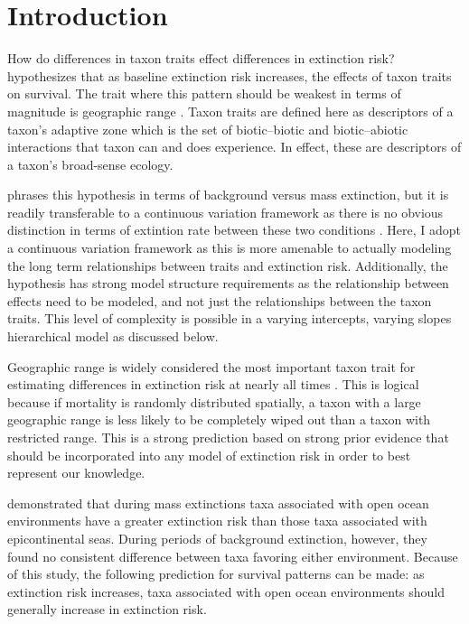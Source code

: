 \documentclass[12pt,letterpaper]{article}
\begin{document}
\section{Introduction}

How do differences in taxon traits effect differences in extinction risk? \citet{Jablonski1987} hypothesizes that as baseline extinction risk increases, the effects of taxon traits on survival. The trait where this pattern should be weakest in terms of magnitude is geographic range \citep{Jablonski1987}. Taxon traits are defined here as descriptors of a taxon's adaptive zone which is the set of biotic--biotic and biotic--abiotic interactions that taxon can and does experience. In effect, these are descriptors of a taxon's broad-sense ecology.

\citet{Jablonski1987} phrases this hypothesis in terms of background versus mass extinction, but it is readily transferable to a continuous variation framework as there is no obvious distinction in terms of extintion rate between these two conditions \citep{Wang2003}. Here, I adopt a continuous variation framework as this is more amenable to actually modeling the long term relationships between traits and extinction risk. Additionally, the \citet{Jablonski1987} hypothesis has strong model structure requirements as the relationship between effects need to be modeled, and not just the relationships between the taxon traits. This level of complexity is possible in a varying intercepts, varying slopes hierarchical model as discussed below.

Geographic range is widely considered the most important taxon trait for estimating differences in extinction risk at nearly all times \citep{Jablonski1986,Jablonski1987,Jablonski2003,Payne2007}. This is logical because if mortality is randomly distributed spatially, a taxon with a large geographic range is less likely to be completely wiped out than a taxon with restricted range. This is a strong prediction based on strong prior evidence that should be incorporated into any model of extinction risk in order to best represent our knowledge.

\citet{Miller2009a} demonstrated that during mass extinctions taxa associated with open ocean environments have a greater extinction risk than those taxa associated with epicontinental seas. During periods of background extinction, however, they found no consistent difference between taxa favoring either environment. Because of this study, the following prediction for survival patterns can be made: as extinction risk increases, taxa associated with open ocean environments should generally increase in extinction risk.
\end{document}
